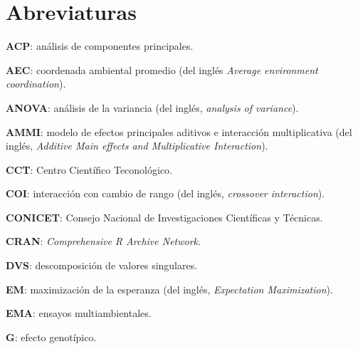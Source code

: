 

\chapter*{Abreviaturas}
\begin{spacing}{1}
\begin{description}
\item{\textbf{ACP}}: análisis de componentes principales.

\item{\textbf{AEC}}: coordenada ambiental promedio (del inglés \emph{Average environment coordination}).

\item{\textbf{ANOVA}}: análisis de la variancia (del inglés, \emph{analysis of variance}).

\item{\textbf{AMMI}}: modelo de efectos principales aditivos e interacción multiplicativa (del inglés, \emph{Additive Main effects and Multiplicative Interaction}).

\item{\textbf{CCT}}: Centro Científico Teconológico.

\item{\textbf{COI}}: interacción con cambio de rango (del inglés, \emph{crossover interaction}).

\item{\textbf{CONICET}}: Consejo Nacional de Investigaciones Científicas y Técnicas.

\item{\textbf{CRAN}}: \emph{Comprehensive R Archive Network}.

\item{\textbf{DVS}}: descomposición de valores singulares.

\item{\textbf{EM}}: maximización de la esperanza (del inglés, \emph{Expectation Maximization}).

\item{\textbf{EMA}}: ensayos multiambientales.

\item{\textbf{G}}: efecto genotípico.


\end{description}
\end{spacing}
